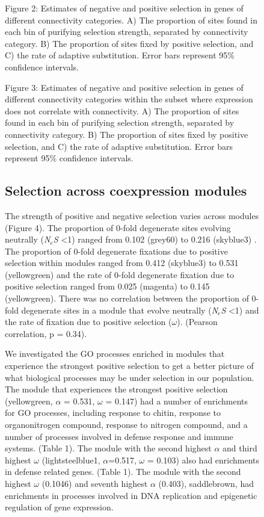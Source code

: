 \begin{figure}[ht!]
Figure 2: Estimates of negative and positive selection in genes of different connectivity categories. A) The proportion of sites found in each bin of purifying selection strength, separated by connectivity category. B) The proportion of sites fixed by positive selection, and C) the rate of adaptive substitution. Error bars represent 95\% confidence intervals.


Figure 3: Estimates of negative and positive selection in genes of different connectivity categories within the subset where expression does not correlate with connectivity. A) The proportion of sites found in each bin of purifying selection strength, separated by connectivity category. B) The proportion of sites fixed by positive selection, and C) the rate of adaptive substitution. Error bars represent 95\% confidence intervals.

\subsection{Selection across coexpression modules}
The strength of positive and negative selection varies across modules (Figure 4). The proportion of 0-fold degenerate sites evolving neutrally (\textit{N$_{e}$S} \textless 1) ranged from 0.102 (grey60) to 0.216 (skyblue3) . The proportion of 0-fold degenerate fixations due to positive selection within modules ranged from  0.412 (skyblue3) to 0.531 (yellowgreen) and the rate of 0-fold degenerate fixation due to positive selection ranged from 0.025 (magenta) to 0.145 (yellowgreen). There was no correlation between the proportion of 0-fold degenerate sites in a module that evolve neutrally (\textit{N$_{e}$S} \textless 1) and the rate of fixation due to positive selection ($\omega$). (Pearson correlation, p = 0.34). 

We investigated the GO processes enriched in modules that experience the strongest positive selection to get a better picture of what biological processes may be under selection in our population. The module that experiences the strongest positive selection (yellowgreen, $\alpha$ = 0.531, $\omega$ = 0.147) had a number of enrichments for GO processes, including response to chitin, response to organonitrogen compound, response to nitrogen compound, and a number of processes involved in defense response and immune systems. (Table 1). The module with the second highest $\alpha$ and third highest $\omega$ (lightsteelblue1, $\alpha$=0.517, $\omega$ = 0.103) also had enrichments in defense related genes. (Table 1).  The module with the second highest $\omega$ (0.1046) and seventh highest $\alpha$ (0.403), saddlebrown, had enrichments in processes involved in DNA replication and epigenetic regulation of gene expression.


\end{figure}
